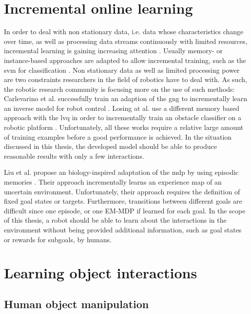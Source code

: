 \section{Incremental online learning}

In order to deal with non stationary data, i.e. data whose characteristics change over time, as well as processing data streams continuously with limited resources, incremental learning is gaining increasing attention \cite{polikar2014guest}. Usually memory- or instance-based approaches are adapted to allow incremental training, such as the \gls{svm} for classification \cite{diehl2003svm}. Non stationary data as well as limited processing power are two constraints researchers in the field of robotics have to deal with. As such, the robotic research community is focusing more on the use of such methods: 
Carlevarino et al. successfully train an adaption of the \gls{gng} to incrementally learn an inverse model for robot control \cite{carlevarino2000incremental}. 
Losing at al. use a different memory based approach with the \gls{lvq} in order to incrementally train an obstacle classifier on a robotic platform \cite{losing2015interactive}.
Unfortunately, all these works require a relative large amount of training examples before a good performance is achieved. In the situation discussed in this thesis, the developed model should be able to produce reasonable results with only a few interactions.

Liu et al. propose an biology-inspired adaptation of the \gls{mdp} by using episodic memories \cite{liu2015robotic, roboticEpisodes}. Their approach incrementally learns an experience map of an uncertain environment. 
Unfortunately, their approach requires the definition of fixed goal states or targets. Furthermore, transitions between different goals are difficult since one episode, or one EM-MDP if learned for each goal. 
In the scope of this thesis, a robot should be able to learn about the interactions in the environment without being provided additional information, such as goal states or rewards for subgoals, by humans.

\section{Learning object interactions}

\subsection{Human object manipulation}

